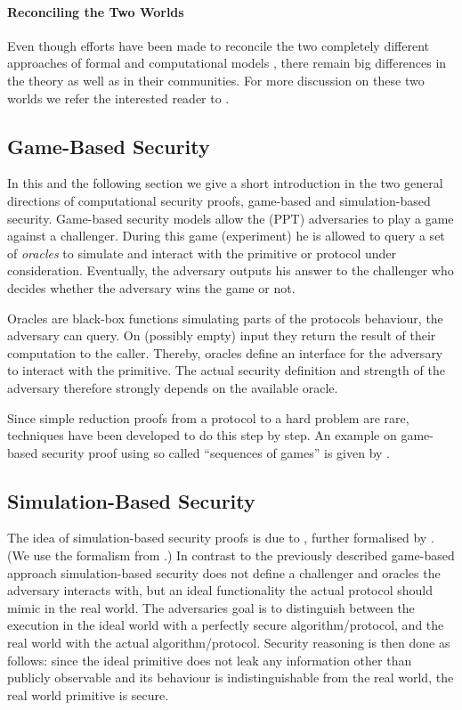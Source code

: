 \paragraph{Reconciling the Two Worlds}
Even though efforts have been made to reconcile the two completely different approaches of formal and computational models \cite{Abadi2002,Herzog2005}, there remain big differences in the theory as well as in their communities.
For more discussion on these two worlds we refer the interested reader to \citet{cortier2011survey}.

\subsection{Game-Based Security}
In this and the following section we give a short introduction in the two general directions of computational security proofs, game-based and simulation-based security.
Game-based security models allow the (\ac{PPT}) adversaries to play a game against a challenger.
During this game (\aka experiment) he is allowed to query a set of \emph{oracles} to simulate and interact with the primitive or protocol under consideration.
Eventually, the adversary outputs his answer to the challenger who decides whether the adversary wins the game or not.

Oracles are black-box functions simulating parts of the protocols behaviour, the adversary can query.
On (possibly empty) input they return the result of their computation to the caller.
Thereby, oracles define an interface for the adversary to interact with the primitive.
The actual security definition and strength of the adversary therefore strongly depends on the available oracle.

Since simple reduction proofs from a protocol to a hard problem are rare, techniques have been developed to do this step by step.
An example on game-based security proof using so called ``sequences of games'' is given by \citet{Shoup2004}.

\subsection{Simulation-Based Security}
The idea of simulation-based security proofs is due to \citet{Goldreich87}, further formalised by \citet{Canetti00}.
(We use the formalism from \citet{Goldreich2001,Goldreich2004}.)
In contrast to the previously described game-based approach simulation-based security does not define a challenger and oracles the adversary interacts with, but an ideal functionality the actual protocol should mimic in the real world.
The adversaries goal is to distinguish between the execution in the ideal world with a perfectly secure algorithm/protocol, and the real world with the actual algorithm/protocol.
Security reasoning is then done as follows: since the ideal primitive does not leak any information other than publicly observable and its behaviour is indistinguishable from the real world, the real world primitive is secure.

